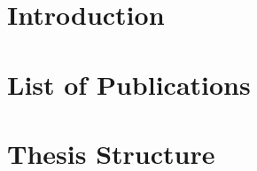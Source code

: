 \section[Introduction]{Introduction}\label{sec:introduction}



\section[Publications]{List of Publications}\label{sec:publications}



\section{Thesis Structure}



